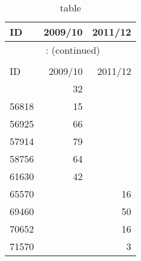 \documentclass{article}
\begin{document}
\hypertarget{table}{} 
\begingroup\footnotesize\begin{longtable}{lrr}
\caption{table}\\
\toprule
ID & 2009/10 & 2011/12 \\
\hline
\endfirsthead
\multicolumn{3}{c}{\tablename~\thetable{}: (continued)}\\\\
\toprule
ID & 2009/10 & 2011/12 \\
\hline
\endhead \hline \endfoot \hline
\endlastfoot
55460 & 32 &  \\
56818 & 15 &  \\
56925 & 66 &  \\
57914 & 79 &  \\
58756 & 64 &  \\
61630 & 42 &  \\
65570 &  & 16 \\
69460 &  & 50 \\
70652 &  & 16 \\
71570 &  & 3 \\
\end{longtable}

\endgroup
\end{document}

